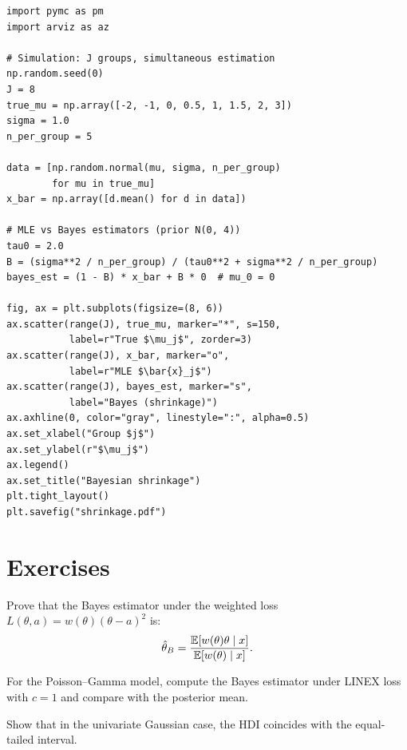 \begin{codeblock}[title=\textbf{Bayesian shrinkage effect}]
\begin{verbatim}
import pymc as pm
import arviz as az

# Simulation: J groups, simultaneous estimation
np.random.seed(0)
J = 8
true_mu = np.array([-2, -1, 0, 0.5, 1, 1.5, 2, 3])
sigma = 1.0
n_per_group = 5

data = [np.random.normal(mu, sigma, n_per_group)
        for mu in true_mu]
x_bar = np.array([d.mean() for d in data])

# MLE vs Bayes estimators (prior N(0, 4))
tau0 = 2.0
B = (sigma**2 / n_per_group) / (tau0**2 + sigma**2 / n_per_group)
bayes_est = (1 - B) * x_bar + B * 0  # mu_0 = 0

fig, ax = plt.subplots(figsize=(8, 6))
ax.scatter(range(J), true_mu, marker="*", s=150,
           label=r"True $\mu_j$", zorder=3)
ax.scatter(range(J), x_bar, marker="o",
           label=r"MLE $\bar{x}_j$")
ax.scatter(range(J), bayes_est, marker="s",
           label="Bayes (shrinkage)")
ax.axhline(0, color="gray", linestyle=":", alpha=0.5)
ax.set_xlabel("Group $j$")
ax.set_ylabel(r"$\mu_j$")
ax.legend()
ax.set_title("Bayesian shrinkage")
plt.tight_layout()
plt.savefig("shrinkage.pdf")
\end{verbatim}
\end{codeblock}

\section{Exercises}

\begin{exercise}
Prove that the Bayes estimator under the weighted loss
$L(\theta, a) = w(\theta)(\theta - a)^2$ is:
\[
  \hat{\theta}_B = \frac{\mathbb{E}[w(\theta)\theta \mid x]}{\mathbb{E}[w(\theta) \mid x]}.
\]
\end{exercise}

\begin{exercise}
For the Poisson--Gamma model, compute the Bayes estimator under LINEX
loss with $c = 1$ and compare with the posterior mean.
\end{exercise}

\begin{exercise}
Show that in the univariate Gaussian case, the HDI coincides with the
equal-tailed interval.
\end{exercise}

